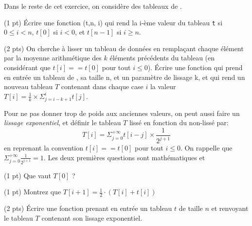 

Dans le reste de cet exercice, on considère des tableaux de \cfloat. 

\question (1 pt) Écrire une fonction (\cvar t,\cvar n, \cvar
i) qui rend la i-ème valeur du tableau \texttt{t} si $0\le i< n$,
$t[0]$ si $i<0$, et $t[n-1]$ si $i\ge n$.

\question (2 pts) On cherche à lisser un tableau de données en
rempla\c cant chaque élément par la moyenne arithmétique des $k$
éléments précédents du tableau (en considérant que $t[i] == t[0]$ pour
tout $i\le 0$). Écrire une fonction qui prend en entrée un tableau de
\cfloat, sa taille \cvar n, et un paramètre de lissage \cvar k, et qui
rend un nouveau tableau $T$ contenant dans chaque case $i$ la valeur
$T[i]=\frac 1k \times\Sigma_{j=i-k+1}^i t[j]$.

Pour ne pas donner trop de poids aux anciennes valeurs, on peut aussi
faire un \emph{lissage exponentiel}, et définir le tableau $T$ lissé en
fonction du non-lissé par:
$$
T[i]=\Sigma_{j=0}^{+\infty} t[i-j] \times \frac 1{2^{j+1}}
$$ 
en reprenant la convention $t[i] == t[0]$ pour tout $i\le 0$.  On
rappelle que $\Sigma_{j=0}^{+\infty} \frac 1{2^{j+1}} = 1$. Les deux
premières questions sont mathématiques et 

\question (1 pt) Que vaut $T[0]$ ?

\question (1 pt) Montrez que \(T[i+1] = \frac 12 \cdot ( T[i] + t[i] )\)

\question (2 pts) Écrire une fonction prenant en entrée un tableau $t$
de taille $n$ et renvoyant le tableau $T$ contenant son lissage
exponentiel.
